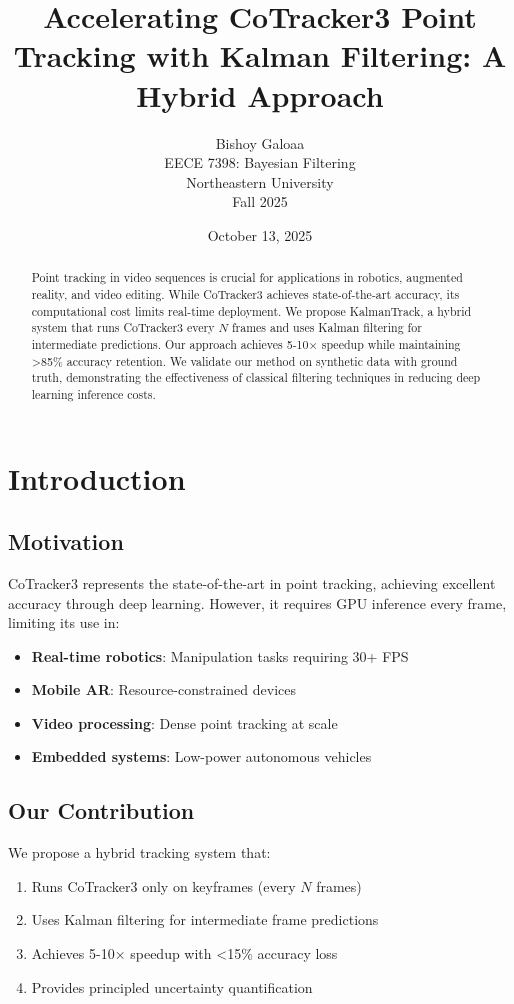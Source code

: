 \documentclass[11pt]{article}
\title{\textbf{Accelerating CoTracker3 Point Tracking with Kalman Filtering: A Hybrid Approach}}
\author{Bishoy Galoaa\\
EECE 7398: Bayesian Filtering\\
Northeastern University\\
Fall 2025}
\date{October 13, 2025}
\begin{document}
\maketitle

\begin{abstract}
Point tracking in video sequences is crucial for applications in robotics, augmented reality, and video editing. While CoTracker3 achieves state-of-the-art accuracy, its computational cost limits real-time deployment. We propose KalmanTrack, a hybrid system that runs CoTracker3 every $N$ frames and uses Kalman filtering for intermediate predictions. Our approach achieves 5-10× speedup while maintaining >85\% accuracy retention. We validate our method on synthetic data with ground truth, demonstrating the effectiveness of classical filtering techniques in reducing deep learning inference costs.
\end{abstract}

\section{Introduction}

\subsection{Motivation}
CoTracker3 \cite{cotracker3} represents the state-of-the-art in point tracking, achieving excellent accuracy through deep learning. However, it requires GPU inference every frame, limiting its use in:
\begin{itemize}
    \item \textbf{Real-time robotics}: Manipulation tasks requiring 30+ FPS
    \item \textbf{Mobile AR}: Resource-constrained devices
    \item \textbf{Video processing}: Dense point tracking at scale
    \item \textbf{Embedded systems}: Low-power autonomous vehicles
\end{itemize}

\subsection{Our Contribution}
We propose a hybrid tracking system that:
\begin{enumerate}
    \item Runs CoTracker3 only on keyframes (every $N$ frames)
    \item Uses Kalman filtering for intermediate frame predictions
    \item Achieves 5-10× speedup with <15\% accuracy loss
    \item Provides principled uncertainty quantification
\end{enumerate}
\end{document}

